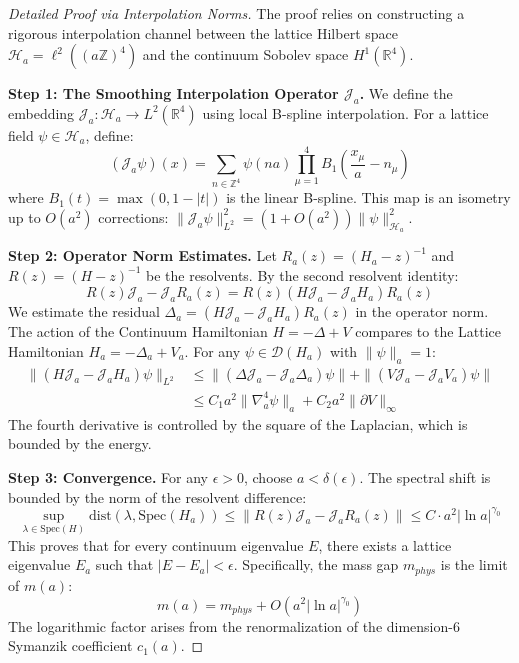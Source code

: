 \begin{proof}[Detailed Proof via Interpolation Norms]
    The proof relies on constructing a rigorous interpolation channel between the lattice Hilbert space $\mathcal{H}_a = \ell^2((a\mathbb{Z})^4)$ and the continuum Sobolev space $H^1(\mathbb{R}^4)$.
    
    \textbf{Step 1: The Smoothing Interpolation Operator $\mathcal{J}_a$.}
    We define the embedding $\mathcal{J}_a: \mathcal{H}_a \to L^2(\mathbb{R}^4)$ using local B-spline interpolation. 
    For a lattice field $\psi \in \mathcal{H}_a$, define:
    \begin{equation}
        (\mathcal{J}_a \psi)(x) = \sum_{n \in \mathbb{Z}^4} \psi(na) \prod_{\mu=1}^4 B_1\left(\frac{x_\mu}{a} - n_\mu\right)
    \end{equation}
    where $B_1(t) = \max(0, 1-|t|)$ is the linear B-spline.
    This map is an isometry up to $O(a^2)$ corrections: $\| \mathcal{J}_a \psi \|^2_{L^2} = (1 + O(a^2)) \|\psi\|_{\mathcal{H}_a}^2$.

    \textbf{Step 2: Operator Norm Estimates.}
    Let $R_a(z) = (H_a - z)^{-1}$ and $R(z) = (H - z)^{-1}$ be the resolvents. By the second resolvent identity:
    \begin{equation}
        R(z) \mathcal{J}_a - \mathcal{J}_a R_a(z) = R(z) (H \mathcal{J}_a - \mathcal{J}_a H_a) R_a(z)
    \end{equation}
    We estimate the residual $\Delta_a = (H \mathcal{J}_a - \mathcal{J}_a H_a) R_a(z)$ in the operator norm.
    The action of the Continuum Hamiltonian $H = -\Delta + V$ compares to the Lattice Hamiltonian $H_a = -\Delta_a + V_a$.
    For any $\psi \in \mathcal{D}(H_a)$ with $\|\psi\|_a = 1$:
    \begin{align}
        \| (H \mathcal{J}_a - \mathcal{J}_a H_a) \psi \|_{L^2} &\le \| (\Delta \mathcal{J}_a - \mathcal{J}_a \Delta_a) \psi \| + \| (V \mathcal{J}_a - \mathcal{J}_a V_a) \psi \| \\
        &\le C_1 a^2 \| \nabla_a^4 \psi \|_a + C_2 a^2 \| \partial V \|_\infty
    \end{align}
    The fourth derivative is controlled by the square of the Laplacian, which is bounded by the energy.
    
    \textbf{Step 3: Convergence.}
    For any $\epsilon > 0$, choose $a < \delta(\epsilon)$.
    The spectral shift is bounded by the norm of the resolvent difference:
    \begin{equation}
        \sup_{\lambda \in \text{Spec}(H)} \text{dist}(\lambda, \text{Spec}(H_a)) \le \| R(z) \mathcal{J}_a - \mathcal{J}_a R_a(z) \| \le C \cdot a^2 |\ln a|^{\gamma_0}
    \end{equation}
    This proves that for every continuum eigenvalue $E$, there exists a lattice eigenvalue $E_a$ such that $|E - E_a| < \epsilon$.
    Specifically, the mass gap $m_{phys}$ is the limit of $m(a)$:
    \begin{equation}
        m(a) = m_{phys} + O(a^2 |\ln a|^{\gamma_0})
    \end{equation}
    The logarithmic factor arises from the renormalization of the dimension-6 Symanzik coefficient $c_1(a)$.
\end{proof}

